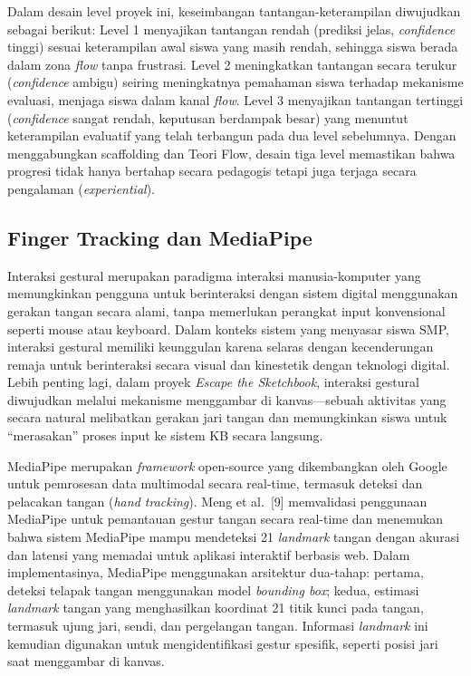 \documentclass[12pt,oneside]{report}
\begin{document}
Dalam desain level proyek ini, keseimbangan tantangan-keterampilan diwujudkan sebagai berikut: Level 1 menyajikan tantangan rendah (prediksi jelas, \textit{confidence} tinggi) sesuai keterampilan awal siswa yang masih rendah, sehingga siswa berada dalam zona \textit{flow} tanpa frustrasi. Level 2 meningkatkan tantangan secara terukur (\textit{confidence} ambigu) seiring meningkatnya pemahaman siswa terhadap mekanisme evaluasi, menjaga siswa dalam kanal \textit{flow}. Level 3 menyajikan tantangan tertinggi (\textit{confidence} sangat rendah, keputusan berdampak besar) yang menuntut keterampilan evaluatif yang telah terbangun pada dua level sebelumnya. Dengan menggabungkan scaffolding dan Teori Flow, desain tiga level memastikan bahwa progresi tidak hanya bertahap secara pedagogis tetapi juga terjaga secara pengalaman (\textit{experiential}).

\subsection{Finger Tracking dan MediaPipe}
\label{subsec:finger-tracking}

Interaksi gestural merupakan paradigma interaksi manusia-komputer yang memungkinkan pengguna untuk berinteraksi dengan sistem digital menggunakan gerakan tangan secara alami, tanpa memerlukan perangkat input konvensional seperti mouse atau keyboard. Dalam konteks sistem yang menyasar siswa SMP, interaksi gestural memiliki keunggulan karena selaras dengan kecenderungan remaja untuk berinteraksi secara visual dan kinestetik dengan teknologi digital. Lebih penting lagi, dalam proyek \textit{Escape the Sketchbook}, interaksi gestural diwujudkan melalui mekanisme menggambar di kanvas---sebuah aktivitas yang secara natural melibatkan gerakan jari tangan dan memungkinkan siswa untuk ``merasakan'' proses input ke sistem KB secara langsung.

MediaPipe merupakan \textit{framework} open-source yang dikembangkan oleh Google untuk pemrosesan data multimodal secara real-time, termasuk deteksi dan pelacakan tangan (\textit{hand tracking}). Meng et al.\ [9] memvalidasi penggunaan MediaPipe untuk pemantauan gestur tangan secara real-time dan menemukan bahwa sistem MediaPipe mampu mendeteksi 21 \textit{landmark} tangan dengan akurasi dan latensi yang memadai untuk aplikasi interaktif berbasis web. Dalam implementasinya, MediaPipe menggunakan arsitektur dua-tahap: pertama, deteksi telapak tangan menggunakan model \textit{bounding box}; kedua, estimasi \textit{landmark} tangan yang menghasilkan koordinat 21 titik kunci pada tangan, termasuk ujung jari, sendi, dan pergelangan tangan. Informasi \textit{landmark} ini kemudian digunakan untuk mengidentifikasi gestur spesifik, seperti posisi jari saat menggambar di kanvas.
\end{document}
